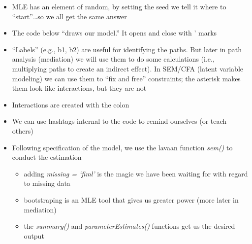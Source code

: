 \documentclass[
  english,
]{book}
\providecommand{\tightlist}{%
  \setlength{\itemsep}{0pt}\setlength{\parskip}{0pt}}
\begin{document}
\begin{itemize}
\tightlist
\item
  MLE has an element of random, by setting the seed we tell it where to ``start''\ldots so we all get the same answer
\item
  The code below ``draws our model.'' It opens and close with ' marks
\item
  ``Labels'' (e.g., b1, b2) are useful for identifying the paths. But later in path analysis (mediation) we will use them to do some calculations (i.e., multiplying paths to create an indirect effect). In SEM/CFA (latent variable modeling) we can use them to ``fix and free'' constraints; the asterisk makes them look like interactions, but they are not
\item
  Interactions are created with the colon
\item
  We can use hashtags internal to the code to remind ourselves (or teach others)
\item
  Following specification of the model, we use the lavaan function \emph{sem()} to conduct the estimation

  \begin{itemize}
  \tightlist
  \item
    adding \emph{missing = `fiml'} is the magic we have been waiting for with regard to missing data
  \item
    bootstraping is an MLE tool that gives us greater power (more later in mediation)
  \item
    the \emph{summary()} and \emph{parameterEstimates()} functions get us the desired output
  \end{itemize}
\end{itemize}
\end{document}
